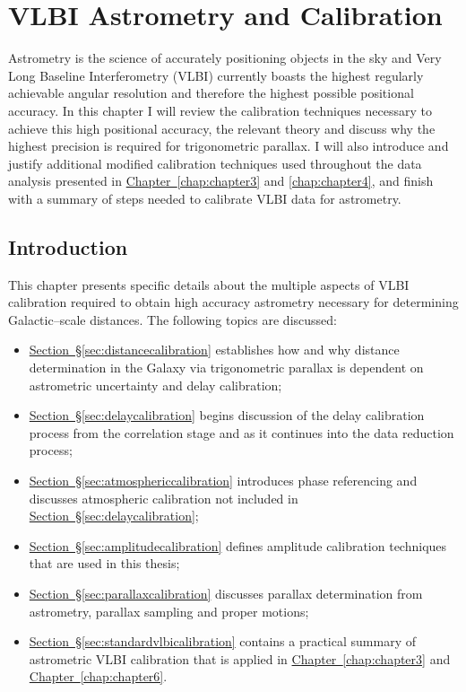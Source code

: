 
\chapter{VLBI Astrometry and Calibration}\label{chap:chapter2}
	\onehalfspacing
	\vspace{5cm}
	Astrometry is the science of accurately positioning objects in the sky and Very Long Baseline Interferometry (VLBI) currently boasts the highest regularly achievable angular 
	resolution and therefore the highest possible positional accuracy. In this chapter I will review the calibration techniques necessary to achieve this high positional accuracy, the relevant theory and discuss why the highest precision is required for trigonometric parallax. I will also introduce and justify additional modified calibration techniques used throughout the data analysis presented in \hyperref[chap:chapter3]{Chapter~\ref*{chap:chapter3}} and \hyperref[chap:chapter4]{\ref*{chap:chapter4}}, and finish with a summary of steps needed to calibrate VLBI data for astrometry.
	
	\singlespacing
	
\newpage
\section{Introduction}
	This chapter presents specific details about the multiple aspects of VLBI calibration required to obtain high accuracy astrometry necessary for determining Galactic--scale distances. The following topics are discussed:
	\begin{itemize}
		\item \hyperref[sec:distancecalibration]{Section~\S\ref*{sec:distancecalibration}} establishes how and why distance determination in the Galaxy via trigonometric parallax is dependent on astrometric uncertainty and delay calibration;
		\item \hyperref[sec:delaycalibration]{Section~\S\ref*{sec:delaycalibration}} begins discussion of the delay calibration process from the correlation stage and as it continues into the data reduction process; 
		\item \hyperref[sec:atmosphericcalibration]{Section~\S\ref*{sec:atmosphericcalibration}} introduces phase referencing and discusses atmospheric calibration not included in \hyperref[sec:delaycalibration]{Section~\S\ref*{sec:delaycalibration}};
		\item \hyperref[sec:amplitudecalibration]{Section~\S\ref*{sec:amplitudecalibration}} defines amplitude calibration techniques that are used in this thesis;
		\item \hyperref[sec:parallaxcalibration]{Section~\S\ref*{sec:parallaxcalibration}} discusses parallax determination from astrometry, parallax sampling and proper motions;
		\item \hyperref[sec:standardvlbicalibration]{Section~\S\ref*{sec:standardvlbicalibration}} contains a practical summary of astrometric VLBI calibration that is applied in \hyperref[chap:chapter3]{Chapter~\ref*{chap:chapter3}} and \hyperref[chap:chapter6]{Chapter~\ref*{chap:chapter6}}.
	\end{itemize}
	
